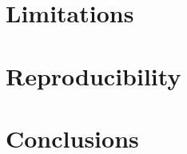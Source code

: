 \documentclass[11pt]{article}
\begin{document}
\section{Limitations}
\label{sec:limitations}


\section{Reproducibility}
\label{sec:reproducibility}


\section{Conclusions}
\label{sec:conclusions}




\end{document}
